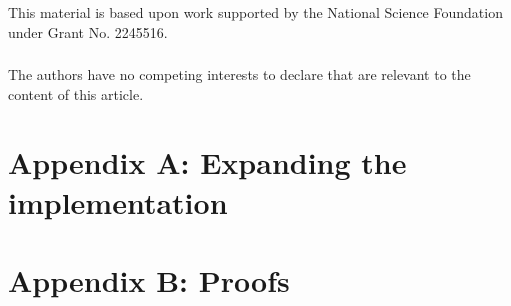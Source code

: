 \documentclass[runningheads]{llncs}
\begin{document}


\begin{credits}
\subsubsection{\ackname}
% 
This material is based upon work supported by the National Science Foundation
under Grant No. 2245516.

\subsubsection{\discintname}
%
The authors have no competing interests to declare that are
relevant to the content of this article.
\end{credits}
%
%
%

% 


\newpage

\section{Appendix A: Expanding the implementation}


\section{Appendix B: Proofs}

\end{document}
